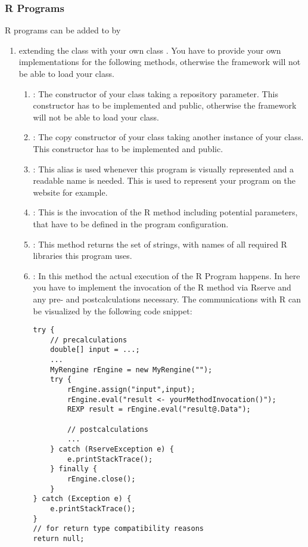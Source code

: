 	\subsubsection{R Programs}\label{subsubsec_extend_rprograms}
	R programs can be added to \clusteval by
	\begin{enumerate}
		\item extending the class  with your own class . You have to provide your own implementations for the following methods, otherwise the framework will not be able to load your class.
		\begin{enumerate}
			\item {}: The constructor of your class taking a repository parameter. This constructor has to be implemented and public, otherwise the framework will not be able to load your class.
			\item {}: The copy constructor of your class taking another instance of your class. This constructor has to be implemented and public.
			\item {}: This alias is used whenever this program is visually represented and a readable name is needed. This is used to represent your program on the website for example.
			\item {}: This is the invocation of the R method including potential parameters, that have to be defined in the program configuration.
			\item {}: This method returns the set of strings, with names of all required R libraries this program uses.
			\item {}: In this method the actual execution of the R Program happens. In here you have to implement the invocation of the R method via Rserve and any pre- and postcalculations necessary. The communications with R can be visualized by the following code snippet:
			\begin{verbatim}
try {
    // precalculations
    double[] input = ...;
    ...
    MyRengine rEngine = new MyRengine("");
    try {
        rEngine.assign("input",input);
        rEngine.eval("result <- yourMethodInvocation()");
        REXP result = rEngine.eval("result@.Data");
        
        // postcalculations
        ...
    } catch (RserveException e) {
        e.printStackTrace();
    } finally {
        rEngine.close();
    }
} catch (Exception e) {
    e.printStackTrace();
}
// for return type compatibility reasons 
return null;
				

\end{verbatim}
\end{enumerate}
\end{enumerate}
